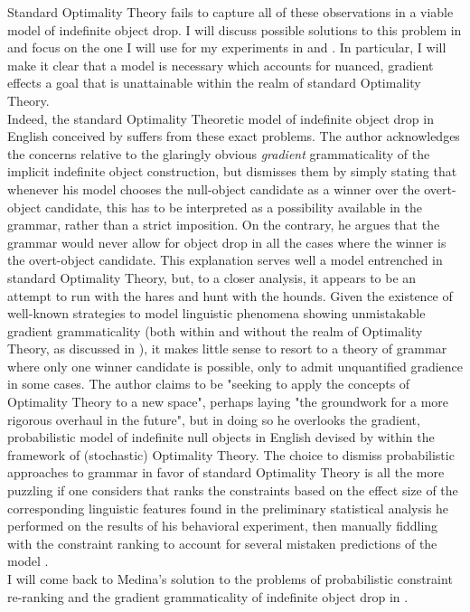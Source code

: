 Standard Optimality Theory fails to capture all of these observations in a viable model of indefinite object drop. I will discuss possible solutions to this problem in  and focus on the one I will use for my experiments in  and . In particular, I will make it clear that a model is necessary which accounts for nuanced, gradient effects \textemdash a goal that is unattainable within the realm of standard Optimality Theory.\\
Indeed, the standard Optimality Theoretic model of indefinite object drop in English conceived by \textcite{yankes2021objectdropot} suffers from these exact problems. The author acknowledges the concerns relative to the glaringly obvious \textit{gradient} grammaticality of the implicit indefinite object construction, but dismisses them by simply stating that whenever his model chooses the null-object candidate as a winner over the overt-object candidate, this has to be interpreted as a possibility available in the grammar, rather than a strict imposition. On the contrary, he argues that the grammar would never allow for object drop in all the cases where the winner is the overt-object candidate. This explanation serves well a model entrenched in standard Optimality Theory, but, to a closer analysis, it appears to be an attempt to run with the hares and hunt with the hounds. Given the existence of well-known strategies to model linguistic phenomena showing unmistakable gradient grammaticality (both within and without the realm of Optimality Theory, as discussed in ), it makes little sense to resort to a theory of grammar where only one winner candidate is possible, only to admit unquantified gradience in some cases. The author claims to be "seeking to apply the concepts of Optimality Theory to a new space", perhaps laying "the groundwork for a more rigorous overhaul in the future", but in doing so he overlooks the gradient, probabilistic model of indefinite null objects in English devised by \textcite{Medina2007} within the framework of (stochastic) Optimality Theory. The choice to dismiss probabilistic approaches to grammar in favor of standard Optimality Theory is all the more puzzling if one considers that \textcite[80]{yankes2021objectdropot} ranks the constraints based on the effect size of the corresponding linguistic features found in the preliminary statistical analysis he performed on the results of his behavioral experiment, then manually fiddling with the constraint ranking to account for several mistaken predictions of the model \parencite[84-90]{yankes2021objectdropot}.\\
I will come back to Medina's solution to the problems of probabilistic constraint re-ranking and the gradient grammaticality of indefinite object drop in .


